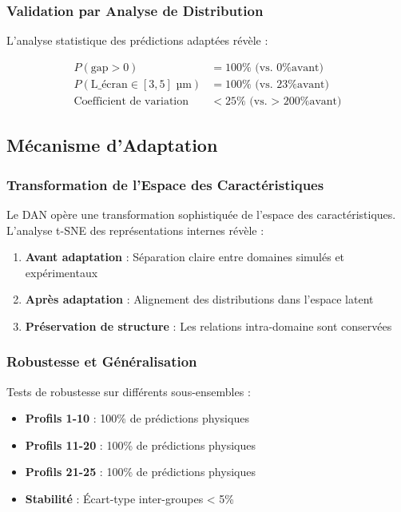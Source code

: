 \documentclass[twocolumn,10pt]{article}
\begin{document}
\subsubsection{Validation par Analyse de Distribution}

L'analyse statistique des prédictions adaptées révèle :

\begin{equation}
\begin{aligned}
P(\text{gap} > 0) &= 100\% \text{ (vs. 0\% avant)} \\
P(\text{L\_écran} \in [3, 5] \text{ µm}) &= 100\% \text{ (vs. 23\% avant)} \\
\text{Coefficient de variation} &< 25\% \text{ (vs. > 200\% avant)}
\end{aligned}
\end{equation}

\subsection{Mécanisme d'Adaptation}

\subsubsection{Transformation de l'Espace des Caractéristiques}

Le DAN opère une transformation sophistiquée de l'espace des caractéristiques. L'analyse t-SNE des représentations internes révèle :

\begin{enumerate}
\item \textbf{Avant adaptation} : Séparation claire entre domaines simulés et expérimentaux
\item \textbf{Après adaptation} : Alignement des distributions dans l'espace latent
\item \textbf{Préservation de structure} : Les relations intra-domaine sont conservées
\end{enumerate}

\subsubsection{Robustesse et Généralisation}

Tests de robustesse sur différents sous-ensembles :
\begin{itemize}
\item \textbf{Profils 1-10} : 100\% de prédictions physiques
\item \textbf{Profils 11-20} : 100\% de prédictions physiques
\item \textbf{Profils 21-25} : 100\% de prédictions physiques
\item \textbf{Stabilité} : Écart-type inter-groupes < 5\%
\end{itemize}
\end{document}
